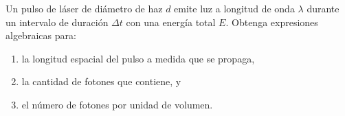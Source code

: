\item Un pulso de láser de diámetro de haz $d$ emite luz a longitud de onda $\lambda$ durante un intervalo de duración $\Delta t$ con una energía total $E$. Obtenga expresiones algebraicas para:
\begin{enumerate}
    \item la longitud espacial del pulso a medida que se propaga,
    \item la cantidad de fotones que contiene, y
    \item el número de fotones por unidad de volumen.
\end{enumerate}